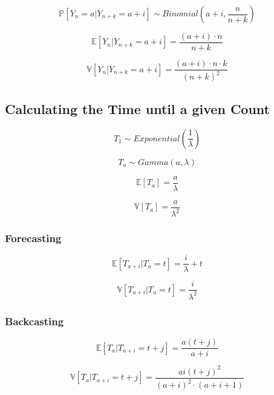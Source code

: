 \begin{equation*}
    \mathbb{P}[Y_n = a | Y_{n + k} = a + i ] 
    \sim Binomial\left(a + i, \frac{n}{n+k}\right)
\end{equation*}

\begin{equation*}
    \mathbb{E}[Y_n | Y_{n + k} = a + i ] =
    \frac{(a + i) \cdot n}{n+k}
\end{equation*}

\begin{equation*}
    \mathbb{V}[Y_n | Y_{n + k} = a + i ] = 
    \frac{(a + i) \cdot n \cdot k}{(n + k)^2}
\end{equation*}

\subsection{Calculating the Time until a given Count}

\begin{equation*}
    T_1 \sim Exponential\left(\frac{1}{\lambda}\right)
\end{equation*}

\begin{equation*}
    T_a \sim Gamma(a, \lambda)
\end{equation*}

\begin{equation*}
    \mathbb{E}[T_a] = \frac{a}{\lambda}
\end{equation*}

\begin{equation*}
    \mathbb{V}[T_a] = \frac{a}{\lambda^2}
\end{equation*}

\subsubsection{Forecasting}
\begin{equation*}
    \mathbb{E}[T_{a + i} | T_a = t] = \frac{i}{\lambda} + t
\end{equation*}

\begin{equation*}
    \mathbb{V}[T_{a + i} | T_a = t] = \frac{i}{\lambda^2}
\end{equation*}


\subsubsection{Backcasting}
\begin{equation*}
    \mathbb{E}[T_a | T_{a + i} = t + j] = \frac{a(t + j)}{a + i}
\end{equation*}

\begin{equation*}
    \mathbb{V}[T_a | T_{a + i} = t + j] = 
    \frac{ ai(t + j)^2 }{ (a + i)^2 \cdot (a + i + 1) }
\end{equation*}
